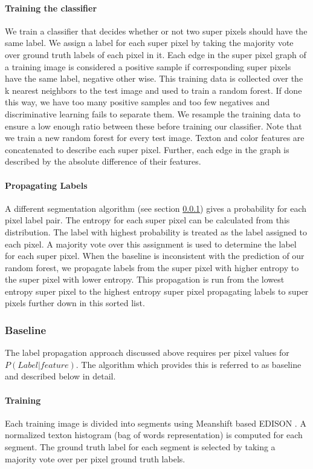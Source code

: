 \documentclass{article} %
\begin{document}
\paragraph{Training the classifier}
We train a classifier that decides whether or not two super pixels should
have the same label.
We assign a label for each super pixel by taking the majority vote over
ground truth labels of each pixel in it.
Each edge in the super pixel graph of a training image is considered a
positive sample if corresponding super pixels have the same label,
negative other wise.
This training data is collected over the k nearest neighbors to the test
image and used to train a random forest.
If done this way, we have too many positive samples and too few negatives
and discriminative learning fails to separate them.
We resample the training data to ensure a low enough ratio between these
before training our classifier.
Note that we train a new random forest for every test image.
Texton and color features are concatenated to describe each super pixel.
Further, each edge in the graph is described by the absolute difference of
their features.

\paragraph{Propagating Labels}
A different segmentation algorithm (see section \ref{baseline}) gives a
probability for each pixel label pair.
The entropy for each super pixel can be calculated from this distribution.
The label with highest probability is treated as the label assigned to
each pixel.
A majority vote over this assignment is used to determine the label for
each super pixel.
When the baseline is inconsistent with the prediction of our random
forest, we propagate labels from the super pixel with higher entropy to
the super pixel with lower entropy.
This propagation is run from the lowest entropy super pixel to the highest
entropy super pixel propagating labels to super pixels further down in
this sorted list.

\subsubsection{Baseline}
\label{baseline}
The label propagation approach discussed above requires per pixel values
for $P(Label|feature)$.
The algorithm which provides this is referred to as baseline and described
below in detail.

\paragraph{Training} Each training image is divided into segments using
Meanshift based EDISON \cite{meanshift}.
A normalized texton histogram (bag of words representation) is computed for each segment.
The ground truth label for each segment is selected by taking a majority vote over per pixel ground truth labels.
\end{document}
